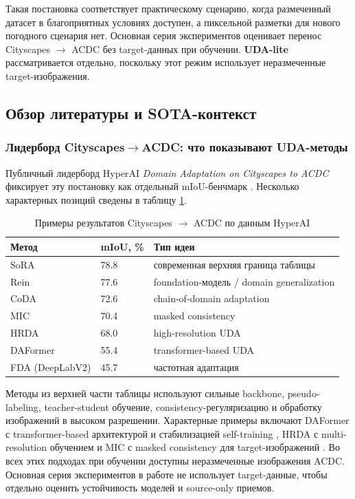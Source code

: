 \documentclass[14pt,a4paper]{extarticle}
\begin{document}
Такая постановка соответствует практическому сценарию, когда размеченный датасет в благоприятных условиях доступен, а пиксельной разметки для нового погодного сценария нет. Основная серия экспериментов оценивает перенос Cityscapes $\rightarrow$ ACDC без target-данных при обучении. \textbf{UDA-lite} рассматривается отдельно, поскольку этот режим использует неразмеченные target-изображения.

\subsection{Обзор литературы и SOTA-контекст}

\subsubsection{Лидерборд \texorpdfstring{Cityscapes$\rightarrow$ACDC}{Cityscapes->ACDC}: что показывают UDA-методы}

Публичный лидерборд HyperAI \textit{Domain Adaptation on Cityscapes to ACDC} фиксирует эту постановку как отдельный mIoU-бенчмарк \cite{hyperai_cityscapes_acdc}. Несколько характерных позиций сведены в таблицу \ref{tab:hyperai_cityscapes_acdc_examples}.

\begin{table}[H]
    \centering
    \caption{Примеры результатов Cityscapes $\rightarrow$ ACDC по данным HyperAI}
    \label{tab:hyperai_cityscapes_acdc_examples}
    \begin{tabularx}{\textwidth}{p{4cm}p{2.4cm}X}
        \toprule
        Метод & mIoU, \% & Тип идеи \\
        \midrule
        SoRA & 78.8 & современная верхняя граница таблицы \\
        Rein & 77.6 & foundation-модель / domain generalization \\
        CoDA & 72.6 & chain-of-domain adaptation \\
        MIC & 70.4 & masked consistency \\
        HRDA & 68.0 & high-resolution UDA \\
        DAFormer & 55.4 & transformer-based UDA \\
        FDA (DeepLabV2) & 45.7 & частотная адаптация \\
        \bottomrule
    \end{tabularx}
\end{table}

Методы из верхней части таблицы используют сильные backbone, pseudo-labeling, teacher-student обучение, consistency-регуляризацию и обработку изображений в высоком разрешении. Характерные примеры включают DAFormer с transformer-based архитектурой и стабилизацией self-training \cite{hoyer2022daformer}, HRDA с multi-resolution обучением \cite{hoyer2022hrda} и MIC с masked consistency для target-изображений \cite{hoyer2023mic}. Во всех этих подходах при обучении доступны неразмеченные изображения ACDC. Основная серия экспериментов в работе не использует target-данные, чтобы отдельно оценить устойчивость моделей и source-only приемов.
\end{document}
